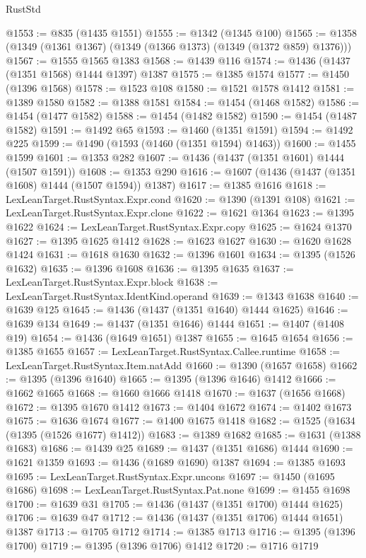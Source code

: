 \begin{lexlean}{RustStd}
\begin{coremodule}
{\begin{coremodule}
{{{{{{{{{{@1553 := @835 (@1435 @1551)
@1555 := @1342 (@1345 @100)
@1565 := @1358 (@1349 (@1361 @1367) (@1349 (@1366 @1373) (@1349 (@1372 @859) @1376)))
@1567 := @1555 @1565 @1383
@1568 := @1439 @116
@1574 := @1436 (@1437 (@1351 @1568) @1444 @1397) @1387
@1575 := @1385 @1574
@1577 := @1450 (@1396 @1568)
@1578 := @1523 @108
@1580 := @1521 @1578 @1412
@1581 := @1389 @1580
@1582 := @1388 @1581
@1584 := @1454 (@1468 @1582)
@1586 := @1454 (@1477 @1582)
@1588 := @1454 (@1482 @1582)
@1590 := @1454 (@1487 @1582)
@1591 := @1492 @65
@1593 := @1460 (@1351 @1591)
@1594 := @1492 @225
@1599 := @1490 (@1593 (@1460 (@1351 @1594) @1463))
@1600 := @1455 @1599
@1601 := @1353 @282
@1607 := @1436 (@1437 (@1351 @1601) @1444 (@1507 @1591))
@1608 := @1353 @290
@1616 := @1607 (@1436 (@1437 (@1351 @1608) @1444 (@1507 @1594)) @1387)
@1617 := @1385 @1616
@1618 := LexLeanTarget.RustSyntax.Expr.cond
@1620 := @1390 (@1391 @108)
@1621 := LexLeanTarget.RustSyntax.Expr.clone
@1622 := @1621 @1364
@1623 := @1395 @1622
@1624 := LexLeanTarget.RustSyntax.Expr.copy
@1625 := @1624 @1370
@1627 := @1395 @1625 @1412
@1628 := @1623 @1627
@1630 := @1620 @1628 @1424
@1631 := @1618 @1630
@1632 := @1396 @1601
@1634 := @1395 (@1526 @1632)
@1635 := @1396 @1608
@1636 := @1395 @1635
@1637 := LexLeanTarget.RustSyntax.Expr.block
@1638 := LexLeanTarget.RustSyntax.IdentKind.operand
@1639 := @1343 @1638
@1640 := @1639 @125
@1645 := @1436 (@1437 (@1351 @1640) @1444 @1625)
@1646 := @1639 @134
@1649 := @1437 (@1351 @1646) @1444
@1651 := @1407 (@1408 @19)
@1654 := @1436 (@1649 @1651) @1387
@1655 := @1645 @1654
@1656 := @1385 @1655
@1657 := LexLeanTarget.RustSyntax.Callee.runtime
@1658 := LexLeanTarget.RustSyntax.Item.natAdd
@1660 := @1390 (@1657 @1658)
@1662 := @1395 (@1396 @1640)
@1665 := @1395 (@1396 @1646) @1412
@1666 := @1662 @1665
@1668 := @1660 @1666 @1418
@1670 := @1637 (@1656 @1668)
@1672 := @1395 @1670 @1412
@1673 := @1404 @1672
@1674 := @1402 @1673
@1675 := @1636 @1674
@1677 := @1400 @1675 @1418
@1682 := @1525 (@1634 (@1395 (@1526 @1677) @1412))
@1683 := @1389 @1682
@1685 := @1631 (@1388 @1683)
@1686 := @1439 @25
@1689 := @1437 (@1351 @1686) @1444
@1690 := @1621 @1359
@1693 := @1436 (@1689 @1690) @1387
@1694 := @1385 @1693
@1695 := LexLeanTarget.RustSyntax.Expr.uncons
@1697 := @1450 (@1695 @1686)
@1698 := LexLeanTarget.RustSyntax.Pat.none
@1699 := @1455 @1698
@1700 := @1639 @31
@1705 := @1436 (@1437 (@1351 @1700) @1444 @1625)
@1706 := @1639 @47
@1712 := @1436 (@1437 (@1351 @1706) @1444 @1651) @1387
@1713 := @1705 @1712
@1714 := @1385 @1713
@1716 := @1395 (@1396 @1700)
@1719 := @1395 (@1396 @1706) @1412
@1720 := @1716 @1719
}}}}}}}}}}
\end{coremodule}}
\end{coremodule}
\end{lexlean}
